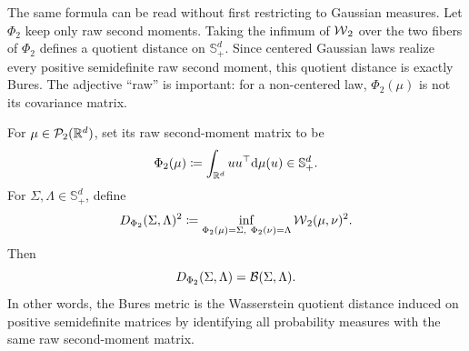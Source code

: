 The same formula can be read without first restricting to Gaussian measures.
Let $\Phi_2$ keep only raw second moments. Taking the infimum of $\operatorname{\mathcal{W}}_2$ over
the two fibers of $\Phi_2$ defines a quotient distance on $\mathbb S_+^d$.
Since centered Gaussian laws realize every positive semidefinite raw second
moment, this quotient distance is exactly Bures. The adjective ``raw'' is
important: for a non-centered law, $\Phi_2(\mu)$ is not its covariance matrix.

\begin{prop}\label{prop-bures-second-moment-lift}
	For $\mu\in\mathcal{P}_2(\mathbb{R}^d)$, set its raw second-moment matrix to be
	\[
		\Phi_2(\mu)\coloneqq \int_{\mathbb{R}^d} uu^\top \mathrm{d}\mu(u)\in\mathbb S_+^d .
	\]
	For $\Sigma,\Lambda\in\mathbb S_+^d$, define
	\[
		D_{\Phi_2}(\Sigma,\Lambda)^2
		\coloneqq
		\inf_{\Phi_2(\mu)=\Sigma,\ \Phi_2(\nu)=\Lambda}
		\operatorname{\mathcal{W}}_2(\mu,\nu)^2 .
	\]
	Then
	\[
		D_{\Phi_2}(\Sigma,\Lambda)=\mathcal{B}(\Sigma,\Lambda).
	\]
	In other words, the Bures metric is the Wasserstein quotient distance induced on positive semidefinite matrices by identifying all probability measures with the same raw second-moment matrix.
\end{prop}
